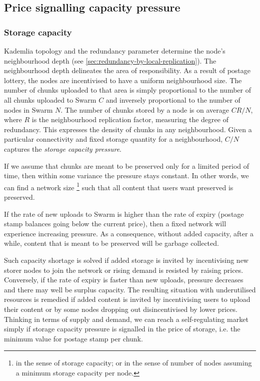 \subsection{Price signalling capacity pressure \statusyellow}\label{sec:capacity-pressure}

\yellow{}

\subsubsection{Storage capacity}
Kademlia topology and the redundancy parameter determine the node's neighbourhood depth (see \ref{sec:redundancy-by-local-replication}). The neighbourhood depth delineates the area of responsibility. As a result of postage lottery, the nodes are incentivised to have a uniform neighbourhood size. The number of chunks uploaded to that area is simply proportional to the number of all chunks uploaded to Swarm $C$ and inversely proportional to the number of nodes in Swarm $N$. The number of chunks stored by a node is on average $CR/N$, where $R$ is the neighbourhood replication factor, measuring the degree of redundancy. This expresses the density of chunks in any neighbourhood. Given a particular connectivity and fixed storage quantity for a neighbourhood, $C/N$ captures the \emph{storage capacity pressure}. 

If we assume that chunks are meant to be preserved only for a limited period of time, then within some variance the pressure stays constant. In other words, we can find a network size%
%
\footnote{in the sense of storage capacity; or in the sense of number of nodes assuming a minimum storage capacity per node.}
%
such that all content that users want preserved is preserved. 

If the rate of new uploads to Swarm is higher than the rate of expiry (postage stamp balances going below the current price), then a fixed network will experience increasing pressure. As a consequence, without added capacity, after a while, content that is meant to be preserved will be garbage collected. 

Such capacity shortage is solved if added storage is invited by incentivising new storer nodes to join the network or rising demand is resisted by raising prices. Conversely, if the rate of expiry is faster than new uploads, pressure decreases and there may well be surplus capacity. The resulting situation with underutilised resources is remedied if added content is invited by incentivising users to upload their content or by some nodes dropping out disincentivised by lower prices. Thinking in terms of supply and demand, we can reach a self-regulating market simply if storage capacity pressure is signalled in the price of storage, i.e. the minimum value for postage stamp per chunk. 

